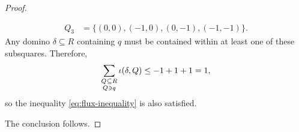 \begin{proof}
\begin{enumerate}
\begin{align}
        Q_3 &= \{ (0, 0), (-1, 0), (0, -1), (-1, -1)\}.
      \end{align}
      Any domino $\delta \subseteq R$ containing $q$ must be contained within at least one of these subsquares. Therefore,
      \begin{equation}
        \sum_{\substack{Q \mskip 1mu \subseteq \mskip 0.3mu R \\[0.2ex] Q \ni q}} \iota(\delta, Q) \leq -1 + 1 + 1 = 1,
      \end{equation}
      so the inequality \eqref{eq:flux-inequality} is also satisfied.
    \end{enumerate}
    The conclusion follows.
\end{proof}